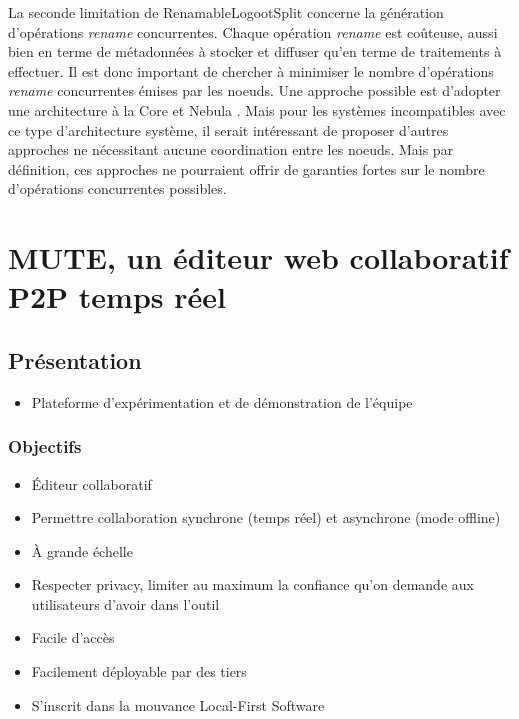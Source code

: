 \documentclass[12pt]{thesul}
\begin{document}
La seconde limitation de RenamableLogootSplit concerne la génération d'opérations \emph{rename} concurrentes.
Chaque opération \emph{rename} est coûteuse, aussi bien en terme de métadonnées à stocker et diffuser qu'en terme de traitements à effectuer.
Il est donc important de chercher à minimiser le nombre d'opérations \emph{rename} concurrentes émises par les noeuds.
Une approche possible est d'adopter une architecture à la Core et Nebula \cite{zawirski:hal-01248197}.
Mais pour les systèmes incompatibles avec ce type d'architecture système, il serait intéressant de proposer d'autres approches ne nécessitant aucune coordination entre les noeuds.
Mais par définition, ces approches ne pourraient offrir de garanties fortes sur le nombre d'opérations concurrentes possibles.

% 

\NumberThisInToc
\chapter{MUTE, un éditeur web collaboratif P2P temps réel}
\minitoc
\section{Présentation}

\begin{itemize}
  \item Plateforme d'expérimentation et de démonstration de l'équipe
\end{itemize}

\subsection{Objectifs}

\begin{itemize}
  \item Éditeur collaboratif
  \item Permettre collaboration synchrone (temps réel) et asynchrone (mode offline)
  \item À grande échelle
  \item Respecter privacy, limiter au maximum la confiance qu'on demande aux utilisateurs d'avoir dans l'outil
  \item Facile d'accès
  \item Facilement déployable par des tiers
  \item S'inscrit dans la mouvance Local-First Software \cite{localfirstsoftware2019,pushpin2020}
\end{itemize}
\end{document}
